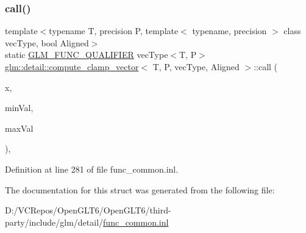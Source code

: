 \subsubsection{\texorpdfstring{call()}{call()}}
{\footnotesize\ttfamily template$<$typename T, precision P, template$<$ typename, precision $>$ class vec\+Type, bool Aligned$>$ \\
static \mbox{\hyperlink{setup_8hpp_a33fdea6f91c5f834105f7415e2a64407}{G\+L\+M\+\_\+\+F\+U\+N\+C\+\_\+\+Q\+U\+A\+L\+I\+F\+I\+ER}} vec\+Type$<$T, P$>$ \mbox{\hyperlink{structglm_1_1detail_1_1compute__clamp__vector}{glm\+::detail\+::compute\+\_\+clamp\+\_\+vector}}$<$ T, P, vec\+Type, Aligned $>$\+::call (\begin{DoxyParamCaption}\item[{vec\+Type$<$ T, P $>$ const \&}]{x,  }\item[{vec\+Type$<$ T, P $>$ const \&}]{min\+Val,  }\item[{vec\+Type$<$ T, P $>$ const \&}]{max\+Val }\end{DoxyParamCaption})\hspace{0.3cm}{\ttfamily [inline]}, {\ttfamily [static]}}



Definition at line 281 of file func\+\_\+common.\+inl.



The documentation for this struct was generated from the following file\+:\begin{DoxyCompactItemize}
\item 
D\+:/\+V\+C\+Repos/\+Open\+G\+L\+T6/\+Open\+G\+L\+T6/third-\/party/include/glm/detail/\mbox{\hyperlink{func__common_8inl}{func\+\_\+common.\+inl}}\end{DoxyCompactItemize}
